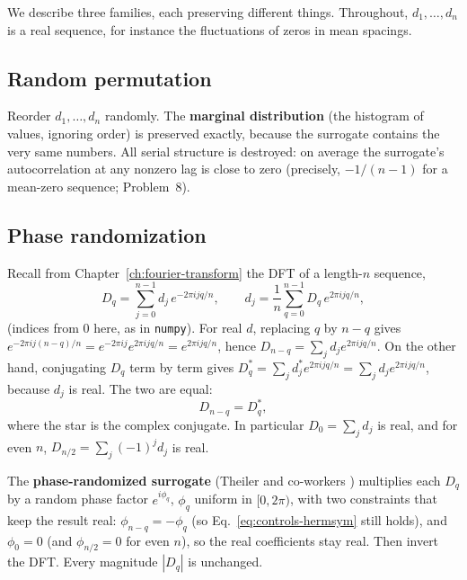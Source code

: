 We describe three families, each preserving different things. Throughout, $d_1,\dots,d_n$ is a real sequence, for instance the fluctuations of zeros in mean spacings.

\subsection{Random permutation}

Reorder $d_1,\dots,d_n$ randomly. The \textbf{marginal distribution} (the histogram of values, ignoring order) is preserved exactly, because the surrogate contains the very same numbers. All serial structure is destroyed: on average the surrogate's autocorrelation at any nonzero lag is close to zero (precisely, $-1/(n-1)$ for a mean-zero sequence; Problem~8).

\subsection{Phase randomization}

Recall from Chapter~\ref{ch:fourier-transform} the DFT of a length-$n$ sequence,
\begin{equation}
D_q=\sum_{j=0}^{n-1}d_j\,e^{-2\pi i jq/n},\qquad d_j=\frac1n\sum_{q=0}^{n-1}D_q\,e^{2\pi i jq/n},
\label{eq:controls-dft}
\end{equation}
(indices from $0$ here, as in \texttt{numpy}). For real $d$, replacing $q$ by $n-q$ gives $e^{-2\pi i j(n-q)/n}=e^{-2\pi ij}e^{2\pi ijq/n}=e^{2\pi ijq/n}$, hence $D_{n-q}=\sum_jd_je^{2\pi ijq/n}$. On the other hand, conjugating $D_q$ term by term gives $D_q^*=\sum_jd_j^*e^{2\pi ijq/n}=\sum_jd_je^{2\pi ijq/n}$, because $d_j$ is real. The two are equal:
\begin{equation}
D_{n-q}=D_q^*,
\label{eq:controls-hermsym}
\end{equation}
where the star is the complex conjugate. In particular $D_0=\sum_jd_j$ is real, and for even $n$, $D_{n/2}=\sum_j(-1)^jd_j$ is real.

The \textbf{phase-randomized surrogate} (Theiler and co-workers \cite{theiler}) multiplies each $D_q$ by a random phase factor $e^{i\phi_q}$, $\phi_q$ uniform in $[0,2\pi)$, with two constraints that keep the result real: $\phi_{n-q}=-\phi_q$ (so Eq.~\eqref{eq:controls-hermsym} still holds), and $\phi_0=0$ (and $\phi_{n/2}=0$ for even $n$), so the real coefficients stay real. Then invert the DFT. Every magnitude $|D_q|$ is unchanged.

